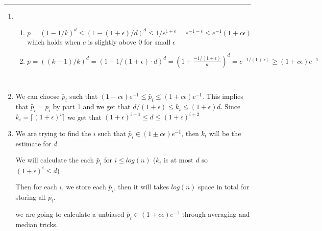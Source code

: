 \documentclass[11pt]{article}
\begin{document}




\begin{quote}

\end{quote}
\hrule


\begin{solution}
\item
\begin{enumerate}
    \item 
    \begin{enumerate}
        \item $ p = (1 - 1/k)^d \leq (1 - (1 + \epsilon)/d)^d \leq 1/e^{1 + \epsilon} = e^{-1-\epsilon} \leq e^{-1}(1+ c \epsilon)$ which holds when $c$ is slightly above 0 for small $\epsilon$

        \item $ p = ((k-1)/k)^d = (1 - 1/(1 + \epsilon)\cdot d)^d = (1 + \frac{-1/(1+\epsilon)}{d})^d = e^{-1/(1+\epsilon)} \geq (1+c\epsilon)e^{-1}$ 
    \end{enumerate}\\
    
    \item We can choose $\tilde{p_i}$ such that $(1 - c \epsilon)e^{-1}  \leq \tilde{p_i} \leq (1 + c \epsilon)e^{-1}$. This implies that $\tilde{p_i} = p_i$ by part 1 and we get that $d/(1 + \epsilon) \leq k_i \leq (1 + \epsilon) d$. Since $k_i = \lceil (1 + \epsilon)^i \rceil$ we get that $(1 + \epsilon)^{i -1} \leq d \leq (1 + \epsilon)^{i+ 2}$\\
    
    \item We are trying to find the $i$ such that $\tilde{p_i} \in (1 \pm c\epsilon)e^{-1}$, then $k_i$ will be the estimate for $d$.
    
    We will calculate the each $\tilde{p_i}$ for $i \leq log(n)$ ($k_i$ is at most $d$ so $(1+\epsilon)^i\leq d$)
    
    Then for each $i$, we store each $\tilde{p_i}$, then it will takes $log(n)$ space in total for storing all $\tilde{p_i}$.
    
    we are going to calculate a unbiased $\tilde{p_i} \in (1\pm c\epsilon)e^{-1}$ through averaging and median tricks. \\
    

\end{enumerate}
\end{solution}
\end{document}
